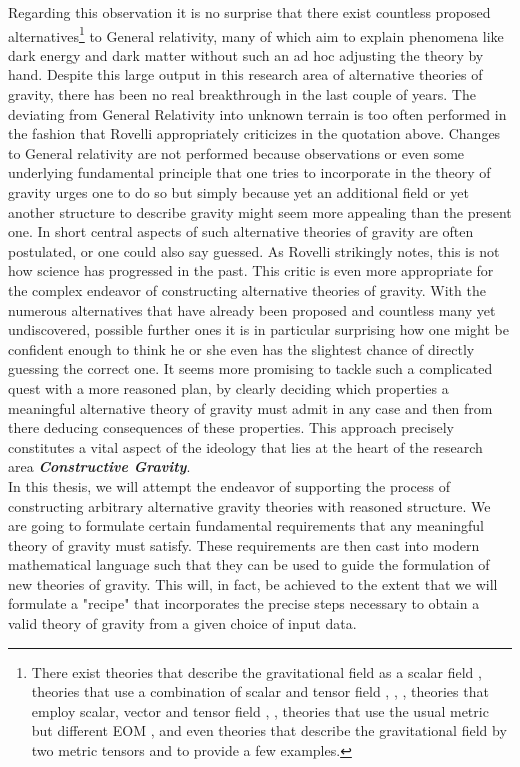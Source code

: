 \documentclass[a4paper,12pt, DIV=14, BCOR=5mm, twoside, headsepline, numbers=noenddot]{scrbook}
\begin{document}
Regarding this observation it is no surprise that there exist countless proposed alternatives\footnote{There exist theories that describe the gravitational field as a scalar field \cite{Scalar1} \cite{Scalar2}, theories that use a combination of scalar and tensor field \cite{ST1}, \cite{ST2}, \cite{ST3}, theories that employ scalar, vector and tensor field \cite{SVT1}, \cite{SVT2}, theories that use the usual metric but different EOM \cite{fR1}, \cite{fR2} and even theories that describe the gravitational field by two metric tensors \cite{BIM1} and \cite{BIM2} to provide a few examples.} to General relativity, many of which aim to explain phenomena like dark energy and dark matter without such an ad hoc adjusting the theory by hand. 
Despite this large output in this research area of alternative theories of gravity, there has been no real breakthrough in the last couple of years. 
The deviating from General Relativity into unknown terrain is too often performed in the fashion that Rovelli appropriately criticizes in the quotation above. Changes to General relativity are not performed because observations or even some underlying fundamental principle that one tries to incorporate in the theory of gravity urges one to do so but simply because yet an additional field or yet another structure to describe gravity might seem more appealing than the present one. In short central aspects of such alternative theories of gravity are often postulated, or one could also say guessed. As Rovelli strikingly notes, this is not how science has progressed in the past. This critic is even more appropriate for the complex endeavor of constructing alternative theories of gravity. 
With the numerous alternatives that have already been proposed and countless many yet undiscovered, possible further ones it is in particular surprising how one might be confident enough to think he or she even has the slightest chance of directly guessing the correct one. It seems more promising to tackle such a complicated quest with a more reasoned plan, by clearly deciding which properties a meaningful alternative theory of gravity must admit in any case and then from there deducing consequences of these properties. 
This approach precisely constitutes a vital aspect of the ideology that lies at the heart of the research area \textit{\textbf{Constructive Gravity}}.\\

In this thesis, we will attempt the endeavor of supporting the process of constructing arbitrary alternative gravity theories with reasoned structure. 
We are going to formulate certain fundamental requirements that any meaningful theory of gravity must satisfy. These requirements are then cast into modern mathematical language such that they can be used to guide the formulation of new theories of gravity. This will, in fact, be achieved to the extent that we will formulate a "recipe" that incorporates the precise steps necessary to obtain a valid theory of gravity from a given choice of input data. 
\end{document}
